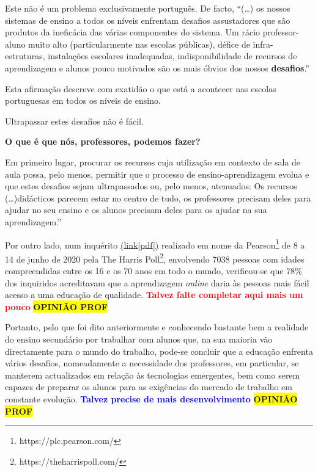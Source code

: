 Este não é um problema exclusivamente português. De facto, ``(\ldots) os nossos sistemas de ensino a todos os níveis enfrentam desafios assustadores que são produtos da ineficácia das várias componentes do sistema. Um rácio professor-aluno muito alto (particularmente nas escolas públicas), défice de infra-estruturas, instalações escolares inadequadas, indisponibilidade de recursos de aprendizagem e alunos pouco motivados são os mais óbvios dos nossos \textbf{desafios}\cite{virtuallabng}.''

Esta afirmação descreve com exatidão o que está a acontecer nas escolas portuguesas em todos os níveis de ensino.

Ultrapassar estes desafios não é fácil. 

\textbf{O que é que nós, professores, podemos fazer?}

Em primeiro lugar, procurar os recursos cuja utilização em contexto de sala de aula possa, pelo menos, permitir que o processo de ensino-aprendizagem evolua e que estes desafios sejam ultrapassados ou, pelo menos, atenuados: Os recursos (\ldots)didácticos parecem estar no centro de tudo, os professores precisam deles para ajudar no seu ensino e os alunos precisam deles para os ajudar na sua aprendizagem\cite{virtuallabng}.''

Por outro lado, num inquérito \href{https://plc.pearson.com/sites/pearson-corp/files/footer-image/pearson-global-learners-survey-2020.pdf}{(link[pdf])} realizado em nome da Pearson\footnote{https://plc.pearson.com/} de 8 a 14 de junho de 2020 pela The Harris Poll\footnote{https://theharrispoll.com/}, envolvendo 7038 pessoas com idades compreendidas entre os 16 e os 70 anos em todo o mundo, verificou-se que 78\% dos inquiridos acreditavam que a aprendizagem \textit{online} daria às pessoas mais fácil acesso a uma educação de qualidade. \textbf{\textcolor{red}{Talvez falte completar aqui mais um pouco}} \colorbox{yellow}{\textbf{OPINIÃO PROF}}

Portanto, pelo que foi dito anteriormente e conhecendo bastante bem a realidade do ensino secundário por trabalhar com alunos que, na sua maioria vão directamente para o mundo do trabalho, pode-se concluir que a educação enfrenta vários desafios, nomeadamente a necessidade dos professores, em particular, se manterem actualizados em relação às tecnologias emergentes, bem como serem capazes de preparar os alunos para as exigências do mercado de trabalho em constante evolução. 
\textcolor{blue}{\textbf{Talvez precise de mais desenvolvimento}} \colorbox{yellow}{\textbf{OPINIÃO PROF}}

